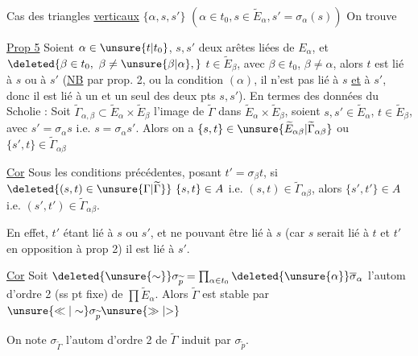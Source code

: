 Cas des triangles \uline{verticaux} $\{\alpha,s,s'\}$ $(\alpha\in t_0,s\in\widetilde E_\alpha,s'=\sigma_\alpha(s))$ On trouve

\uline{Prop 5} \quad Soient $\alpha\in\unsure{t|t_0}$, $s,s'$ deux arêtes liées de $E_\alpha$, et $\deleted{\beta\in t_0,\ \beta\ne\unsure{\beta|\alpha},}$ $t\in\widetilde E_\beta$, avec $\beta\in t_0$, $\beta\ne\alpha$, alors $t$ est lié à  $s$ ou à $s'$ (\uline{NB} par prop. 2, ou  la condition $(\alpha)$,  il n'est pas lié à $s$ \uline{et} à $s'$, donc il est lié à un et un seul des deux pts $s,s'$). En termes des données du Scholie : Soit $\widetilde\Gamma_{\alpha,\beta}\subset\widetilde E_\alpha\times\widetilde E_\beta$ l'image de $\widetilde\Gamma$ dans $\widetilde E_\alpha\times\widetilde E_\beta$, soient $s,s'\in\widetilde E_\alpha$, $t\in\widetilde E_\beta$, avec $s'=\sigma_\alpha s$ i.e. $s=\sigma_\alpha s'$. Alors on a $\{s,t\}\in\unsure{\widetilde E_{\alpha\beta}|\widetilde\Gamma_{\alpha\beta}}$ ou $\{s',t\}\in\widetilde\Gamma_{\alpha\beta}$

\noindent\vrule\hspace{.5em}\begin{minipage}{.89\linewidth}\uline{Cor} \quad {} Sous les conditions précédentes, posant $t'=\sigma_\beta t$, si  $\deleted{(s,t)\in\unsure{\Gamma|\widetilde\Gamma}}\ \{s,t\}\in A$ i.e. $(s,t)\in\widetilde\Gamma_{\alpha\beta}$, alors  $\{s',t'\}\in A$ i.e. $(s',t')\in\widetilde\Gamma_{\alpha\beta}$.

\end{minipage}

En effet, $t'$ étant lié à $s$ ou $s'$, et ne pouvant être lié à $s$ (car $s$ serait lié à $t$ et $t'$ en opposition à prop 2) il est lié à $s'$.

\noindent\vrule\hspace{.5em}\begin{minipage}{.89\linewidth}\uline{Cor} \quad Soit $\deleted{\unsure{\sim}}\sigma_{\widetilde p}=\prod_{\alpha\in t_0}\deleted{\unsure{\alpha}}\overline\sigma_\alpha$ l'autom  d'ordre 2 (ss pt fixe) de $\prod\widetilde E_\alpha$. Alors $\widetilde\Gamma$ est stable par $\unsure{\ll|\sim}\sigma_{\widetilde p}\unsure{\gg|{>}}$\end{minipage}

On note $\sigma_{\widetilde\Gamma}$ l'autom d'ordre 2 de $\widetilde\Gamma$ induit par $\sigma_{\widetilde p}$.
